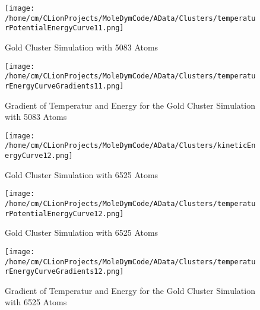 \begin{figure}[!h] 
    \begin{center} 
        \texttt{[image: /home/cm/CLionProjects/MoleDymCode/AData/Clusters/temperaturPotentialEnergyCurve11.png]} 
    \end{center} 
    \caption[Gold Cluster Simulation with 5083 Atoms]{Gold Cluster Simulation with 5083 Atoms} 
    \label{GoldClusterSimulationTemperaturEnergy5083} 
\end{figure} 
 
\begin{figure}[!h] 
    \begin{center} 
        \texttt{[image: /home/cm/CLionProjects/MoleDymCode/AData/Clusters/temperaturEnergyCurveGradients11.png]} 
    \end{center} 
    \caption[Gradient of Temperatur and Energy for the Gold Cluster Simulation with 5083 Atoms]{Gradient of Temperatur and Energy for the Gold Cluster Simulation with 5083 Atoms} 
    \label{GoldClusterSimulationGradient5083} 
\end{figure} 
 
\begin{figure}[!h] 
    \begin{center} 
        \texttt{[image: /home/cm/CLionProjects/MoleDymCode/AData/Clusters/kineticEnergyCurve12.png]} 
    \end{center} 
    \caption[Gold Cluster Simulation with 6525 Atoms]{Gold Cluster Simulation with 6525 Atoms} 
    \label{GoldClusterSimulationKineticTime6525} 
\end{figure} 
 
\begin{figure}[!h] 
    \begin{center} 
        \texttt{[image: /home/cm/CLionProjects/MoleDymCode/AData/Clusters/temperaturPotentialEnergyCurve12.png]} 
    \end{center} 
    \caption[Gold Cluster Simulation with 6525 Atoms]{Gold Cluster Simulation with 6525 Atoms} 
    \label{GoldClusterSimulationTemperaturEnergy6525} 
\end{figure} 
 
\begin{figure}[!h] 
    \begin{center} 
        \texttt{[image: /home/cm/CLionProjects/MoleDymCode/AData/Clusters/temperaturEnergyCurveGradients12.png]} 
    \end{center} 
    \caption[Gradient of Temperatur and Energy for the Gold Cluster Simulation with 6525 Atoms]{Gradient of Temperatur and Energy for the Gold Cluster Simulation with 6525 Atoms} 
    \label{GoldClusterSimulationGradient6525} 
\end{figure} 
 
